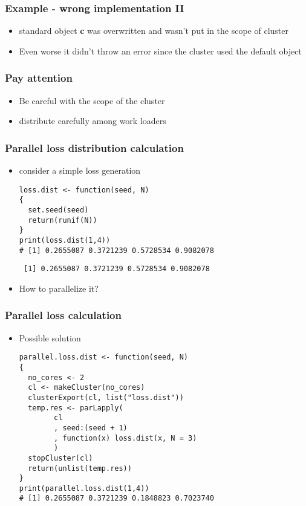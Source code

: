 \documentclass[bigger]{beamer}
\begin{document}
\begin{frame}
\frametitle{Example - wrong implementation II}
\label{sec-3-11}
\begin{itemize}

\item standard object \textbf{c} was overwritten and wasn't put in the scope of cluster
\label{sec-3-11-1}%

\item Even worse it didn't throw an error since the cluster used the default object
\label{sec-3-11-2}%
\end{itemize} %
\end{frame}
\begin{frame}
\frametitle{Pay attention}
\label{sec-3-12}
\begin{itemize}

\item Be careful with the scope of the cluster
\label{sec-3-12-1}%

\item distribute carefully among work loaders
\label{sec-3-12-2}%
\end{itemize} %
\end{frame}
\begin{frame}[fragile]
\frametitle{Parallel loss distribution calculation}
\label{sec-3-13}
\begin{itemize}

\item consider a simple loss generation\\
\label{sec-3-13-1}%
\begin{verbatim}
loss.dist <- function(seed, N)
{
  set.seed(seed)
  return(runif(N))
}
print(loss.dist(1,4))
# [1] 0.2655087 0.3721239 0.5728534 0.9082078
\end{verbatim}

\begin{verbatim}
 [1] 0.2655087 0.3721239 0.5728534 0.9082078
\end{verbatim}


\item How to parallelize it?
\label{sec-3-13-2}%
\end{itemize} %
\end{frame}
\begin{frame}[fragile]
\frametitle{Parallel loss calculation}
\label{sec-3-14}
\begin{itemize}

\item Possible solution\\
\label{sec-3-14-1}%
\begin{verbatim}
parallel.loss.dist <- function(seed, N)
{
  no_cores <- 2
  cl <- makeCluster(no_cores)
  clusterExport(cl, list("loss.dist"))
  temp.res <- parLapply(
        cl
        , seed:(seed + 1)
        , function(x) loss.dist(x, N = 3)
        )
  stopCluster(cl)
  return(unlist(temp.res))
}
print(parallel.loss.dist(1,4))
# [1] 0.2655087 0.3721239 0.1848823 0.7023740
\end{verbatim}


\end{itemize} %
\end{frame}
\end{document}
